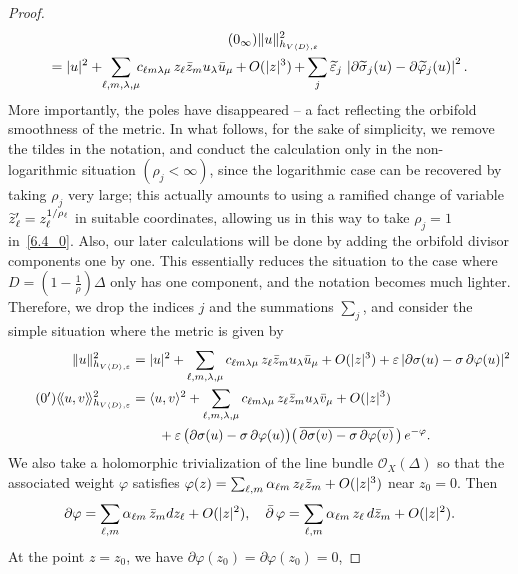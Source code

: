 \documentclass[AHL,Unicode,longabstracts,published]{cedram}
\DeclareMathOperator{\dbar}{\bar\partial}
\DeclarePairedDelimiter{\abs}{\lvert}{\rvert}
\DeclarePairedDelimiter{\Abs}{\lVert}{\rVert}
\newcommand*\cO{\mathcal{O}}
\let\oldtilde\tilde
\renewcommand*{\tilde}[1]{\mathchoice{\widetilde{#1}}{\widetilde{#1}}{\oldtilde{#1}}{\oldtilde{#1}}}
\begin{document}
\begin{proof}
\begin{multline}
\tag{$\theequation_{\infty}$}
\Abs{u}_{h_{V\langle D\rangle,\varepsilon}}^2 \\
=
\abs{u}^2+{}\kern-4pt
\sum_{\ell,m,\lambda,\mu}\kern-4pt c_{\ell m\lambda\mu}\,z_\ell\bar z_m u_\lambda\bar u_\mu\,{+}\,O(\abs{z}^3)
\,{+}\sum_j\tilde\varepsilon_j\,
\left|\partial\tilde\sigma_j(u)-\partial\tilde\varphi_j(u)\right|^2.
\end{multline}
More importantly, the poles have disappeared -- a fact reflecting the orbifold smoothness of the metric. In what follows, for the sake of simplicity, we remove the tildes in the notation, and conduct the calculation only in the non-logarithmic situation $(\rho_j<\infty)$, since the logarithmic case can be recovered by taking $\rho_j$ very large; this actually amounts to using a ramified change of variable $\tilde z'_\ell=\smash{z_\ell^{1/\rho_\ell}}$ in suitable coordinates, allowing us in this way to take $\rho_j=1$ in~\eqref{6.4_0}. Also, our later calculations will be done by adding the orbifold divisor components one by one. This essentially reduces the situation to the case where $D=(1-\tfrac{1}{\rho})\Delta$ only has one component, and the notation becomes much lighter. Therefore, we drop the indices $j$ and the summations $\sum_j$, and consider the simple situation where the metric is given by
\begin{align}\label{6.8}
\Abs{u}_{h_{V\langle D\rangle,\varepsilon}}^2 &=
\abs{u}^2+\sum_{\ell,m,\lambda,\mu}c_{\ell m\lambda\mu}\,z_\ell\bar z_m u_\lambda\bar u_\mu+O(\abs{z}^3)+\varepsilon\,|\partial\sigma(u) -\sigma\,\partial\varphi(u)|^2
\\
\tag{\theequation\ensuremath{'}}\label{6.8'}
\langle\!\langle u,v\rangle\!\rangle_{h_{V\langle D\rangle,\varepsilon}}^2 &=
\langle u,v\rangle^2+
\sum_{\ell,m,\lambda,\mu}c_{\ell m\lambda\mu}\,z_\ell\bar z_m u_\lambda\bar v_\mu+O(\abs{z}^3)
\\
\nonumber&
\qquad+\varepsilon\,\big(\partial\sigma(u)-\sigma\,\partial\varphi(u)\big)
\big(\,\overline{\partial\sigma(v)-\sigma\,\partial\varphi(v)}\,\big)
\,e^{-\varphi}.
\end{align}
We also take a holomorphic trivialization of the line bundle $\cO_X(\Delta)$ so that the associated weight $\varphi$ satisfies
$\varphi(z)=\sum_{\ell,m}\alpha_{\ell m}\,z_\ell\bar z_m+O(\abs{z}^3)$ near
$z_0=0$. Then
\[
\partial\varphi=\sum_{\ell,m}\alpha_{\ell m}\,\bar z_m dz_\ell+O(\abs{z}^2),
\quad
\dbar\varphi=\sum_{\ell,m}\alpha_{\ell m}\,z_\ell\,d\bar z_m+O(\abs{z}^2).
\]
At the point $z=z_0$, we have $\partial\varphi(z_0)=\partial\varphi(z_0)=0$,

\end{proof}
\end{document}
